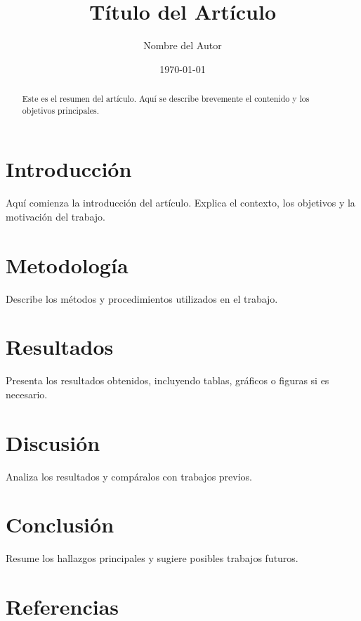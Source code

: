 \documentclass[12pt,a4paper]{article}
\title{Título del Artículo}
\author{Nombre del Autor}
\date{\today}
\begin{document}
\maketitle

\begin{abstract}
Este es el resumen del artículo. Aquí se describe brevemente el contenido y los objetivos principales.
\end{abstract}

\section{Introducción}
Aquí comienza la introducción del artículo. Explica el contexto, los objetivos y la motivación del trabajo.

\section{Metodología}
Describe los métodos y procedimientos utilizados en el trabajo.

\section{Resultados}
Presenta los resultados obtenidos, incluyendo tablas, gráficos o figuras si es necesario.

\section{Discusión}
Analiza los resultados y compáralos con trabajos previos.

\section{Conclusión}
Resume los hallazgos principales y sugiere posibles trabajos futuros.

\section*{Referencias}


\end{document}
